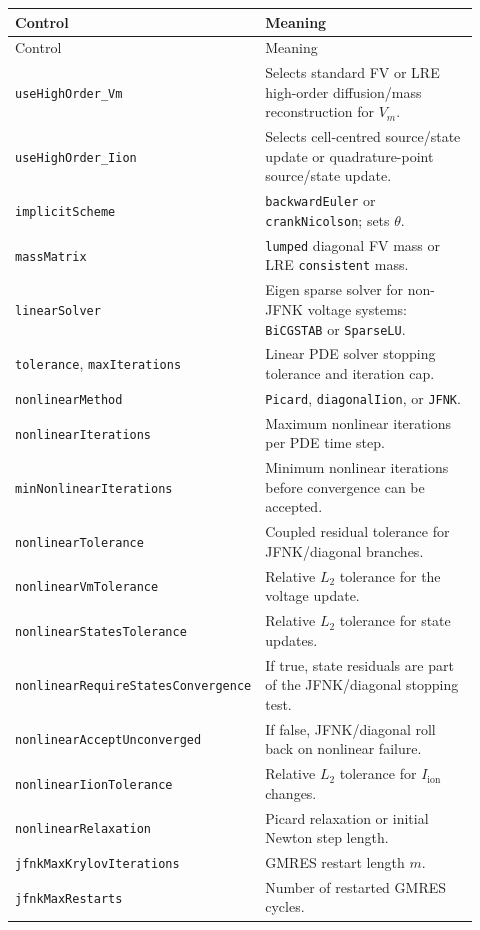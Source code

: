\documentclass[11pt,a4paper]{article}
\newcommand{\code}[1]{\texttt{\small #1}}
\newcommand{\Vm}{V_m}
\newcommand{\Iion}{I_{\mathrm{ion}}}
\begin{document}
\begin{longtable}{@{}p{0.34\linewidth}p{0.58\linewidth}@{}}
\toprule
Control & Meaning \\
\midrule
\endfirsthead
\toprule
Control & Meaning \\
\midrule
\endhead
\code{useHighOrder\_Vm} & Selects standard FV or LRE high-order diffusion/mass reconstruction for $\Vm$. \\
\code{useHighOrder\_Iion} & Selects cell-centred source/state update or quadrature-point source/state update. \\
\code{implicitScheme} & \code{backwardEuler} or \code{crankNicolson}; sets $\theta$. \\
\code{massMatrix} & \code{lumped} diagonal FV mass or LRE \code{consistent} mass. \\
\code{linearSolver} & Eigen sparse solver for non-JFNK voltage systems: \code{BiCGSTAB} or \code{SparseLU}. \\
\code{tolerance}, \code{maxIterations} & Linear PDE solver stopping tolerance and iteration cap. \\
\code{nonlinearMethod} & \code{Picard}, \code{diagonalIion}, or \code{JFNK}. \\
\code{nonlinearIterations} & Maximum nonlinear iterations per PDE time step. \\
\code{minNonlinearIterations} & Minimum nonlinear iterations before convergence can be accepted. \\
\code{nonlinearTolerance} & Coupled residual tolerance for JFNK/diagonal branches. \\
\code{nonlinearVmTolerance} & Relative $L_2$ tolerance for the voltage update. \\
\code{nonlinearStatesTolerance} & Relative $L_2$ tolerance for state updates. \\
\code{nonlinearRequireStatesConvergence} & If true, state residuals are part of the JFNK/diagonal stopping test. \\
\code{nonlinearAcceptUnconverged} & If false, JFNK/diagonal roll back on nonlinear failure. \\
\code{nonlinearIionTolerance} & Relative $L_2$ tolerance for $\Iion$ changes. \\
\code{nonlinearRelaxation} & Picard relaxation or initial Newton step length. \\
\code{jfnkMaxKrylovIterations} & GMRES restart length $m$. \\
\code{jfnkMaxRestarts} & Number of restarted GMRES cycles. \\

\end{longtable}
\end{document}
